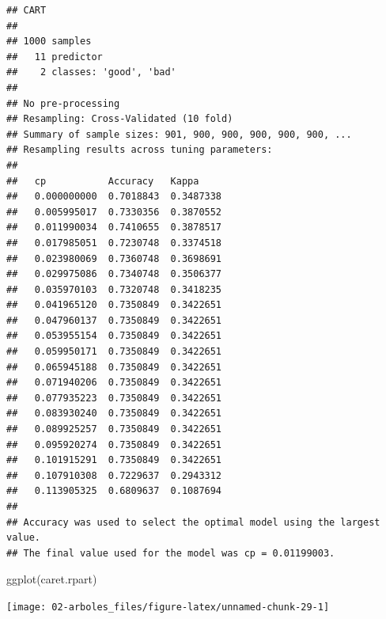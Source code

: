 \documentclass[
  spanish,
]{book}
\newenvironment{Shaded}{\begin{snugshade}}{\end{snugshade}}
\newcommand{\FunctionTok}[1]{\textcolor[rgb]{0.00,0.00,0.00}{#1}}
\newcommand{\NormalTok}[1]{#1}
\newcommand{\SpecialCharTok}[1]{\textcolor[rgb]{0.00,0.00,0.00}{#1}}
\theoremstyle{break}
\theoremstyle{definition}
\theoremstyle{definition}
\theoremstyle{definition}
\theoremstyle{definition}
\theoremstyle{remark}
\begin{document}
\begin{verbatim}
## CART 
## 
## 1000 samples
##   11 predictor
##    2 classes: 'good', 'bad' 
## 
## No pre-processing
## Resampling: Cross-Validated (10 fold) 
## Summary of sample sizes: 901, 900, 900, 900, 900, 900, ... 
## Resampling results across tuning parameters:
## 
##   cp           Accuracy   Kappa    
##   0.000000000  0.7018843  0.3487338
##   0.005995017  0.7330356  0.3870552
##   0.011990034  0.7410655  0.3878517
##   0.017985051  0.7230748  0.3374518
##   0.023980069  0.7360748  0.3698691
##   0.029975086  0.7340748  0.3506377
##   0.035970103  0.7320748  0.3418235
##   0.041965120  0.7350849  0.3422651
##   0.047960137  0.7350849  0.3422651
##   0.053955154  0.7350849  0.3422651
##   0.059950171  0.7350849  0.3422651
##   0.065945188  0.7350849  0.3422651
##   0.071940206  0.7350849  0.3422651
##   0.077935223  0.7350849  0.3422651
##   0.083930240  0.7350849  0.3422651
##   0.089925257  0.7350849  0.3422651
##   0.095920274  0.7350849  0.3422651
##   0.101915291  0.7350849  0.3422651
##   0.107910308  0.7229637  0.2943312
##   0.113905325  0.6809637  0.1087694
## 
## Accuracy was used to select the optimal model using the largest value.
## The final value used for the model was cp = 0.01199003.
\end{verbatim}

\begin{Shaded}
\begin{Highlighting}[]
\FunctionTok{ggplot}\NormalTok{(caret.rpart)}
\end{Highlighting}
\end{Shaded}

\begin{center}\texttt{[image: 02-arboles\_files/figure-latex/unnamed-chunk-29-1]} \end{center}

\begin{Shaded}
\end{Shaded}
\end{document}
